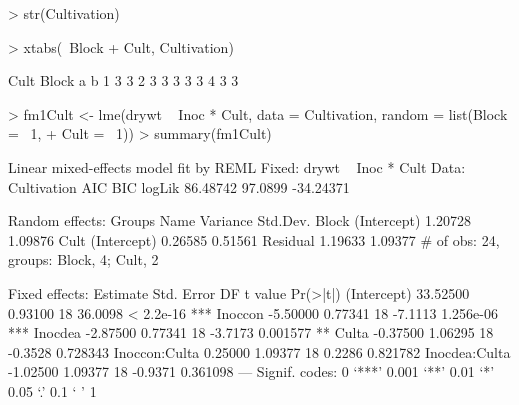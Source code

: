 \documentclass[12pt]{article}
\begin{document}
\begin{Schunk}
\begin{Sinput}
> str(Cultivation)
\end{Sinput}
\begin{Sinput}
> xtabs(~Block + Cult, Cultivation)
\end{Sinput}
\begin{Soutput}
     Cult
Block a b
    1 3 3
    2 3 3
    3 3 3
    4 3 3
\end{Soutput}
\begin{Sinput}
> fm1Cult <- lme(drywt ~ Inoc * Cult, data = Cultivation, random = list(Block = ~1, 
+     Cult = ~1))
> summary(fm1Cult)
\end{Sinput}
\begin{Soutput}
Linear mixed-effects model fit by REML
Fixed: drywt ~ Inoc * Cult 
 Data: Cultivation 
      AIC     BIC    logLik
 86.48742 97.0899 -34.24371

Random effects:
 Groups   Name        Variance Std.Dev.
 Block    (Intercept) 1.20728  1.09876 
 Cult     (Intercept) 0.26585  0.51561 
 Residual             1.19633  1.09377 
# of obs: 24, groups: Block, 4; Cult, 2

Fixed effects:
              Estimate Std. Error DF t value  Pr(>|t|)    
(Intercept)   33.52500    0.93100 18 36.0098 < 2.2e-16 ***
Inoccon       -5.50000    0.77341 18 -7.1113 1.256e-06 ***
Inocdea       -2.87500    0.77341 18 -3.7173  0.001577 ** 
Culta         -0.37500    1.06295 18 -0.3528  0.728343    
Inoccon:Culta  0.25000    1.09377 18  0.2286  0.821782    
Inocdea:Culta -1.02500    1.09377 18 -0.9371  0.361098    
---
Signif. codes:  0 `***' 0.001 `**' 0.01 `*' 0.05 `.' 0.1 ` ' 1 


\end{Soutput}
\end{Schunk}
\end{document}
